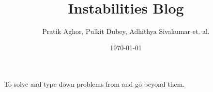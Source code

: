 \documentclass{book}
\author{Pratik Aghor, Pulkit Dubey, Adhithya Sivakumar et. al.}
\title{Instabilities Blog}
\date{\today}  %
\begin{document}
\maketitle
To solve and type-down problems from \cite{drazin2004hydrodynamic} and go beyond them. 




 \if@openright\cleardoublepage\else\clearpage\fi
 \cleardoublepage
 \pagestyle{empty}
\end{document}
